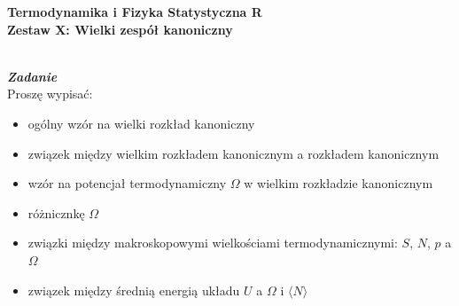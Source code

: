 \documentclass[11pt,a4paper]{article}
\newcounter{zadanie}\newcommand{\zadanie}[1][]{\addtocounter{zadanie}{1} ~\\ {\bf \emph{Zadanie \arabic{zadanie} #1 }} \\}
\begin{document}
   

\begin{centering}
  {\bf {\Large
  Termodynamika i Fizyka Statystyczna R \\
  Zestaw X: Wielki zespół kanoniczny
  }} \\  
\end{centering}

\vspace{1cm}

\zadanie[]

Proszę wypisać:
\begin{itemize}
\item ogólny wzór na wielki rozkład kanoniczny
\item związek między wielkim rozkładem kanonicznym a rozkładem kanonicznym
\item wzór na potencjał termodynamiczny $\Omega$ w wielkim rozkładzie kanonicznym
\item różnicznkę  $\Omega$ 
\item związki między makroskopowymi wielkościami termodynamicznymi:
      $S$, $N$, $p$ a $\Omega$
\item związek między średnią energią układu $U$ a $\Omega$ i $\langle N \rangle$      
\end{itemize}
\end{document}
